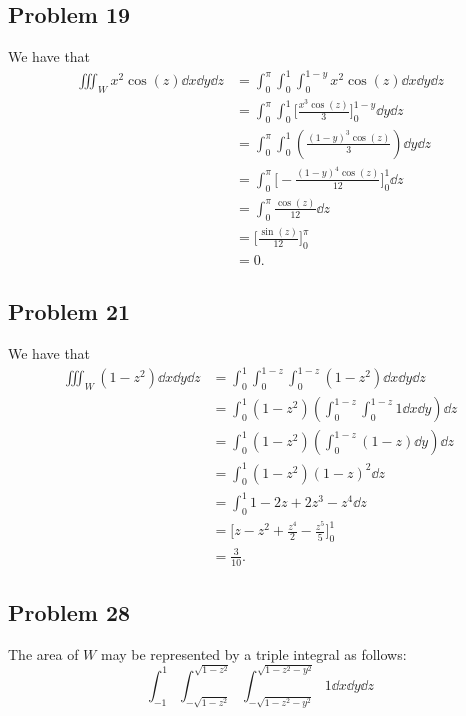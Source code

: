 \documentclass[11pt]{article}
\begin{document}

\subsection*{Problem 19}

We have that
\begin{align*}
	\iiint_{W} x^{2} \cos(z) \dd{x} \dd{y} \dd{z} &= \int_{0}^{\pi} \int_{0}^{1} \int_{0}^{1 - y} x^{2} \cos(z) \dd{x} \dd{y} \dd{z} \\
	&= \int_{0}^{\pi} \int_{0}^{1} \Big[ \frac{x^{3}\cos(z)}{3} \Big]_{0}^{1 - y} \dd{y} \dd{z} \\
	&= \int_{0}^{\pi} \int_{0}^{1} \left( \frac{(1 - y)^{3}\cos(z)}{3} \right) \dd{y} \dd{z} \\
	&= \int_{0}^{\pi} \Big[ - \frac{(1 - y)^{4}\cos(z)}{12} \Big]_{0}^{1} \dd{z} \\
	&= \int_{0}^{\pi} \frac{\cos(z)}{12} \dd{z} \\
	&= \Big[ \frac{\sin(z)}{12} \Big]_{0}^{\pi} \\
	&= \boxed{0}.
\end{align*}


\subsection*{Problem 21}

We have that
\begin{align*}
	\iiint_{W} (1 - z^{2}) \dd{x} \dd{y} \dd{z} &= \int_{0}^{1} \int_{0}^{1 - z} \int_{0}^{1 - z} (1 - z^{2}) \dd{x} \dd{y} \dd{z} \\
	&= \int_{0}^{1} (1 - z^{2}) \left( \int_{0}^{1 - z} \int_{0}^{1 - z} 1 \dd{x} \dd{y} \right) \dd{z} \\
	&= \int_{0}^{1} (1 - z^{2}) \left( \int_{0}^{1 - z} (1 - z) \dd{y} \right) \dd{z} \\
	&= \int_{0}^{1} (1 - z^{2}) (1 - z)^{2} \dd{z} \\
	&= \int_{0}^{1} 1 - 2z + 2z^{3} - z^{4} \dd{z} \\
	&= \Big[ z - z^{2} + \frac{z^{4}}{2} - \frac{z^{5}}{5} \Big]_{0}^{1} \\
	&= \boxed{\frac{3}{10}}.
\end{align*}


\subsection*{Problem 28}

The area of $W$ may be represented by a triple integral as follows:
\[
	\boxed{\int_{-1}^{1} \int_{-\sqrt{1 - z^{2}}}^{\sqrt{1 - z^{2}}} \int_{-\sqrt{1 - z^{2} - y^{2}}}^{\sqrt{1 - z^{2} - y^{2}}} 1 \dd{x} \dd{y} \dd{z}}
\]

\end{document}
